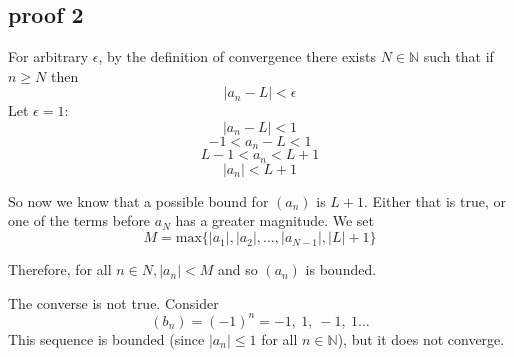 \documentclass[11pt, oneside]{article}
\begin{document}
\subsection*{proof 2}
For arbitrary $\epsilon$, by the definition of convergence there exists $N \in \mathbb{N}$ such that if $n \ge N$ then
\[ |a_n - L| < \epsilon \]
Let $\epsilon = 1$:
\[ |a_n - L| < 1 \]
\[ -1 < a_n - L < 1 \]
\[ L-1 < a_n < L+1 \]
\[ |a_n| < L + 1 \]

So now we know that a possible bound for $(a_n)$ is $L + 1$. Either that is true, or one of the terms before $a_N$ has a greater magnitude.  We set
\[ M = \text{max} \{|a_1|, |a_2|, \dots ,|a_{N-1}|, |L| + 1 \} \]

Therefore, for all $n \in N, |a_n| < M$ and so $(a_n)$ is bounded.

The converse is not true.  Consider
\[ (b_n) = (-1)^n = -1, \ 1, \ -1, \ 1 \dots \]
This sequence is bounded (since $|a_n| \le 1$ for all $n \in \mathbb{N}$), but it does not converge.
\end{document}
